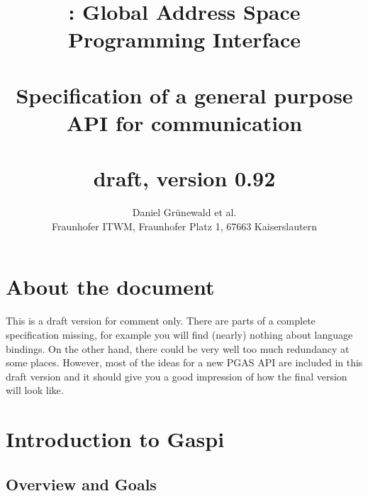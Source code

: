 \documentclass[a4paper]{article}
\title{\GASPI{}: Global Address Space Programming Interface\\
~\\
Specification of a general purpose API for communication\\
~\\
draft, version 0.92
}
\author{Daniel Gr\"unewald et al.\\
Fraunhofer ITWM, Fraunhofer Platz 1, 67663 Kaiserslautern
}
\makeatletter
\newlength{\st}\setlength{\st}{0pt}
\newcommand{\GASPI}{{\sc Gaspi}}
\newcounter{counttodo}
\newlength{\savetabcolsep}
\newlength{\savearrayrulewidth}
\newenvironment{todo}
{\stepcounter{counttodo}
 \typeout{Environment TODO call \thecounttodo}
 \setlength{\savetabcolsep}{\tabcolsep}
 \setlength{\savearrayrulewidth}{\arrayrulewidth}
 \renewcommand{\tabcolsep}{0pt}
 \renewcommand{\arrayrulewidth}{2pt}
 \begin{center}
 \begin{tabular}{c|l@{\hspace*{2em}}|@{\hspace*{2em}}c}
 &
 \begin{minipage}{0.66\textwidth}
 \begin{itemize}
}
{\end{itemize}
 \end{minipage}
 &  todo \#\thecounttodo
 \end{tabular} \marginpar{$\Longleftarrow$}
 \end{center}
 \renewcommand{\tabcolsep}{\savetabcolsep}
 \renewcommand{\arrayrulewidth}{\savearrayrulewidth}
}
\makeatother
\begin{document}
\begin{titlepage}
\maketitle
\end{titlepage}

\tableofcontents


\newpage


\section{About the document}

This is a draft version for comment only. There are parts of a
complete specification missing, for example you will find (nearly)
nothing about language bindings. On the other hand, there could be
very well too much redundancy at some places. However, most of the
ideas for a new PGAS API are included in this draft version and it
should give you a good impression of how the final version will look
like.

\section{Introduction to \GASPI{}}
\label{sec::Intro}

\subsection{Overview and Goals}
\label{subsec::Overview}
\end{document}
